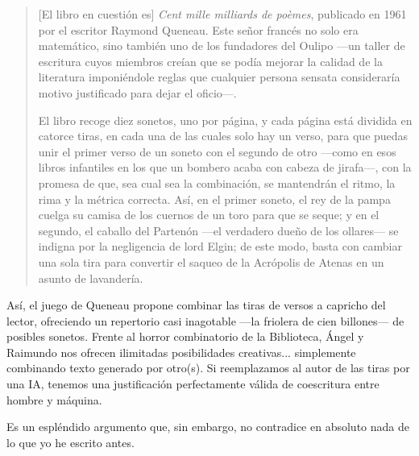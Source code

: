 \documentclass[11pt,a4paper]{article}
\begin{document}
\begin{quotation}
[El libro en cuestión es] \emph{Cent mille milliards de poèmes}, publicado en 1961 por el escritor Raymond Queneau. Este señor francés no solo era matemático, sino también uno de los fundadores del Oulipo ---un taller de escritura cuyos miembros creían que se podía mejorar la calidad de la literatura imponiéndole reglas que cualquier persona sensata consideraría motivo justificado para dejar el oficio---.

El libro recoge diez sonetos, uno por página, y cada página está dividida en catorce tiras, en cada una de las cuales solo hay un verso, para que puedas unir el primer verso de un soneto con el segundo de otro ---como en esos libros infantiles en los que un bombero acaba con cabeza de jirafa---, con la promesa de que, sea cual sea la combinación, se mantendrán el ritmo, la rima y la métrica correcta. Así, en el primer soneto, el rey de la pampa cuelga su camisa de los cuernos de un toro para que se seque; y en el segundo, el caballo del Partenón ---el verdadero dueño de los ollares--- se indigna por la negligencia de lord Elgin; de este modo, basta con cambiar una sola tira para convertir el saqueo de la Acrópolis de Atenas en un asunto de lavandería.
\end{quotation}

Así, el juego de Queneau propone combinar las tiras de versos a capricho del lector, ofreciendo un repertorio casi inagotable ---la friolera de cien billones--- de posibles sonetos. Frente al horror combinatorio de la Biblioteca, Ángel y Raimundo nos ofrecen ilimitadas posibilidades creativas... simplemente combinando texto generado por otro(s). Si reemplazamos al autor de las tiras por una IA, tenemos una justificación perfectamente válida de coescritura entre hombre y máquina.

Es un espléndido argumento que, sin embargo, no contradice en absoluto nada de lo que yo he escrito antes.
\end{document}
